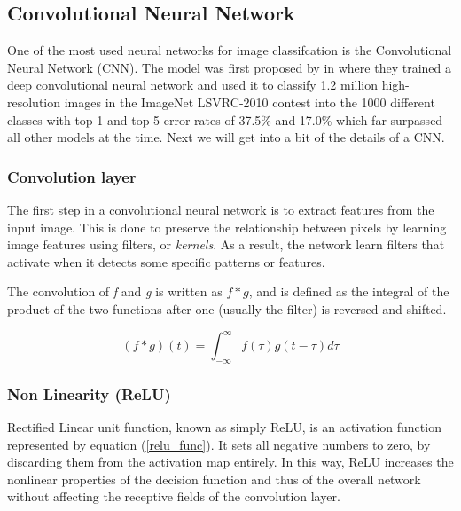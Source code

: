\documentclass[english, a4paper]{article}
\begin{document}
\subsection{Convolutional Neural Network} \label{convolutional_neural_network}
One of the most used neural networks for image classifcation is the Convolutional Neural Network (CNN). The model was first proposed by \citeauthor*{ImageNetClassification12} in \citeyear{ImageNetClassification12} \cite{ImageNetClassification12} where they trained a deep convolutional neural network and used it to classify 1.2 million high-resolution images in the ImageNet LSVRC-2010 contest into the 1000 different classes with top-1 and top-5 error rates of 37.5\% and 17.0\% which far surpassed all other models at the time. Next we will get into a bit of the details of a CNN.


\subsubsection{Convolution layer}
The first step in a convolutional neural network is to extract features from the input image. This is done to preserve the relationship between pixels by learning image features using filters, or \textit{kernels}. As a result, the network learn filters that activate when it detects some specific patterns or features.

The convolution of \textit{f} and \textit{g} is written as $f*g$, and is defined as the integral of the product of the two functions after one (usually the filter) is reversed and shifted.

\begin{equation} %
  (f*g)(t) = \int_{-\infty}^{\infty} f(\tau) g(t-\tau) d\tau
  \label{convolution_func}
\end{equation}


\subsubsection{Non Linearity (ReLU)}
Rectified Linear unit function, known as simply ReLU, is an activation function represented by equation (\ref{relu_func}). It sets all negative numbers to zero, by discarding them from the activation map entirely. In this way, ReLU increases the nonlinear properties of the decision function and thus of the overall network without affecting the receptive fields of the convolution layer.
\end{document}
